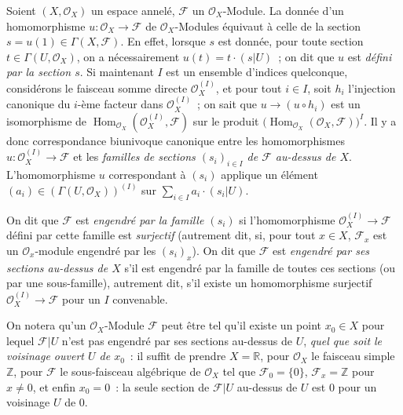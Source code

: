 \begin{env}[5.1.1]
\label{0.5.1.1-fr}
Soient $(X,\mathcal{O}_X)$ un espace annelé, $\mathcal{F}$ un
$\mathcal{O}_X$-Module. La donnée d'un homomorphisme
$u:\mathcal{O}_X\to\mathcal{F}$ de $\mathcal{O}_X$-Modules équivaut à celle
de la section $s=u(1)\in\Gamma(X,\mathcal{F})$. En effet, lorsque $s$ est
donnée, pour toute section $t\in\Gamma(U,\mathcal{O}_X)$, on a nécessairement
$u(t)=t\cdot(s|U)$~; on dit que $u$ est \emph{défini par la section $s$}. Si
maintenant $I$ est un ensemble d'indices quelconque, considérons le faisceau
somme directe $\mathcal{O}_X^{(I)}$, et pour tout $i\in I$, soit $h_i$
l'injection canonique du $i$-ème facteur dans $\mathcal{O}_X^{(I)}$~; on sait
que $u\to(u\circ h_i)$ est un isomorphisme de
$\operatorname{Hom}_{\mathcal{O}_X}(\mathcal{O}_X^{(I)},\mathcal{F})$ sur le
produit
$\bigl(\operatorname{Hom}_{\mathcal{O}_X}(\mathcal{O}_X,\mathcal{F})\bigr)^I$.
Il y a donc correspondance biunivoque canonique entre les homomorphismes
$u:\mathcal{O}_X^{(I)}\to\mathcal{F}$ et les \emph{familles de sections
$(s_i)_{i\in I}$ de $\mathcal{F}$ au-dessus de $X$}. L'homomorphisme $u$
correspondant à $(s_i)$ applique un élément
$(a_i)\in(\Gamma(U,\mathcal{O}_X))^{(I)}$ sur
$\sum_{i\in I}a_i\cdot(s_i|U)$.

On dit que $\mathcal{F}$ est \emph{engendré par la famille $(s_i)$} si
l'homomorphisme $\mathcal{O}_X^{(I)}\to\mathcal{F}$ défini
par cette famille est \emph{surjectif} (autrement dit, si, pour tout
$x\in X$, $\mathcal{F}_x$ est un $\mathcal{O}_x$-module engendré par les
$(s_i)_x$). On dit que $\mathcal{F}$ est \emph{engendré par ses sections
au-dessus de $X$} s'il est engendré par la famille de toutes ces sections (ou
par une sous-famille), autrement dit, s'il existe un homomorphisme surjectif
$\mathcal{O}_X^{(I)}\to\mathcal{F}$ pour un $I$ convenable.

On notera qu'un $\mathcal{O}_X$-Module $\mathcal{F}$ peut être tel qu'il
existe un point $x_0\in X$ pour lequel $\mathcal{F}|U$ n'est pas engendré par
ses sections au-dessus de $U$, \emph{quel que soit le voisinage ouvert $U$ de
$x_0$}~: il suffit de prendre $X=\mathbb{R}$, pour $\mathcal{O}_X$ le faisceau
simple $\mathbb{Z}$, pour $\mathcal{F}$ le sous-faisceau algébrique de
$\mathcal{O}_X$ tel que $\mathcal{F}_0=\{0\}$, $\mathcal{F}_x=\mathbb{Z}$ pour
$x\ne0$, et enfin $x_0=0$~: la seule section de $\mathcal{F}|U$ au-dessus de
$U$ est $0$ pour un voisinage $U$ de $0$.
\end{env}

